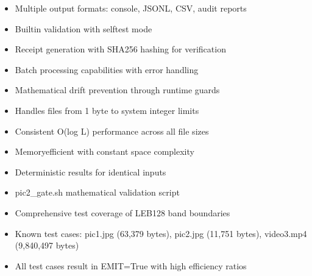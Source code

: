 \documentclass[letterpaper,10pt,english]{sphinxmanual}
\begin{document}
\sphinxAtStartPar
{}
\begin{itemize}
\item {} 
\sphinxAtStartPar
Multiple output formats: console, JSONL, CSV, audit reports

\item {} 
\sphinxAtStartPar
Built\sphinxhyphen{}in validation with \textendash{}self\sphinxhyphen{}test mode

\item {} 
\sphinxAtStartPar
Receipt generation with SHA\sphinxhyphen{}256 hashing for verification

\item {} 
\sphinxAtStartPar
Batch processing capabilities with error handling

\item {} 
\sphinxAtStartPar
Mathematical drift prevention through runtime guards

\end{itemize}

\sphinxAtStartPar
{}
\begin{itemize}
\item {} 
\sphinxAtStartPar
Handles files from 1 byte to system integer limits

\item {} 
\sphinxAtStartPar
Consistent O(log L) performance across all file sizes

\item {} 
\sphinxAtStartPar
Memory\sphinxhyphen{}efficient with constant space complexity

\item {} 
\sphinxAtStartPar
Deterministic results for identical inputs

\end{itemize}

\sphinxAtStartPar
{}
\begin{itemize}
\item {} 
\sphinxAtStartPar
pic2\_gate.sh mathematical validation script

\item {} 
\sphinxAtStartPar
Comprehensive test coverage of LEB128 band boundaries

\item {} 
\sphinxAtStartPar
Known test cases: pic1.jpg (63,379 bytes), pic2.jpg (11,751 bytes), video3.mp4 (9,840,497 bytes)

\item {} 
\sphinxAtStartPar
All test cases result in EMIT=True with high efficiency ratios

\end{itemize}
\end{document}
